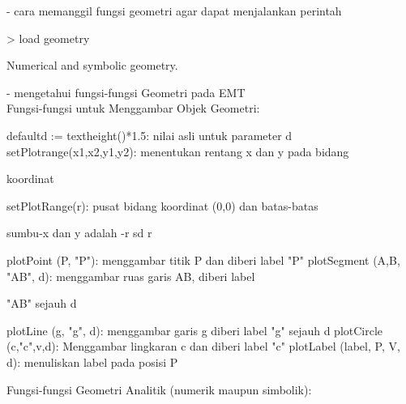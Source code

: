 \documentclass[a4paper,10pt]{article}
\begin{document}
\begin{eulernotebook}
\begin{eulercomment}
\begin{eulercomment}
\begin{eulercomment}
\begin{eulercomment}
\begin{eulercomment}
- cara memanggil fungsi geometri agar dapat menjalankan perintah
\end{eulercomment}
\begin{eulerprompt}
> load geometry
\end{eulerprompt}
\begin{euleroutput}
  Numerical and symbolic geometry.
\end{euleroutput}
\begin{eulercomment}
- mengetahui fungsi-fungsi Geometri pada EMT\\
Fungsi-fungsi untuk Menggambar Objek Geometri:

\end{eulercomment}
\begin{eulerttcomment}
  defaultd := textheight()*1.5: nilai asli untuk parameter d
  setPlotrange(x1,x2,y1,y2): menentukan rentang x dan y pada bidang
\end{eulerttcomment}
\begin{eulercomment}
koordinat\\
\end{eulercomment}
\begin{eulerttcomment}
  setPlotRange(r): pusat bidang koordinat (0,0) dan batas-batas
\end{eulerttcomment}
\begin{eulercomment}
sumbu-x dan y adalah -r sd r\\
\end{eulercomment}
\begin{eulerttcomment}
  plotPoint (P, "P"): menggambar titik P dan diberi label "P"
  plotSegment (A,B, "AB", d): menggambar ruas garis AB, diberi label
\end{eulerttcomment}
\begin{eulercomment}
"AB" sejauh d\\
\end{eulercomment}
\begin{eulerttcomment}
  plotLine (g, "g", d): menggambar garis g diberi label "g" sejauh d
  plotCircle (c,"c",v,d): Menggambar lingkaran c dan diberi label "c"
  plotLabel (label, P, V, d): menuliskan label pada posisi P
\end{eulerttcomment}
\begin{eulercomment}

Fungsi-fungsi Geometri Analitik (numerik maupun simbolik):


\end{eulercomment}
\end{eulercomment}
\end{eulercomment}
\end{eulercomment}
\end{eulercomment}
\end{eulernotebook}
\end{document}
